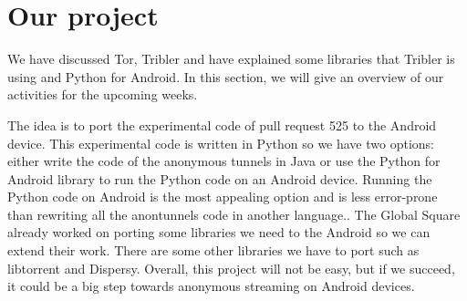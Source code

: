 \section{Our project}
	\label{sec:our-project}
	We have discussed Tor, Tribler and have explained some libraries that Tribler is using and Python for Android. In this section, we will give an overview of our activities for the upcoming weeks.
		
	The idea is to port the experimental code of pull request 525 to the Android device. This experimental code is written in Python so we have two options: either write the code of the anonymous tunnels in Java or use the Python for Android library to run the Python code on an Android device. Running the Python code on Android is the most appealing option and is less error-prone than rewriting all the anontunnels code in another language.. The Global Square already worked on porting some libraries we need to the Android so we can extend their work. There are some other libraries we have to port such as libtorrent and Dispersy. Overall, this project will not be easy, but if we succeed, it could be a big step towards anonymous streaming on Android devices.